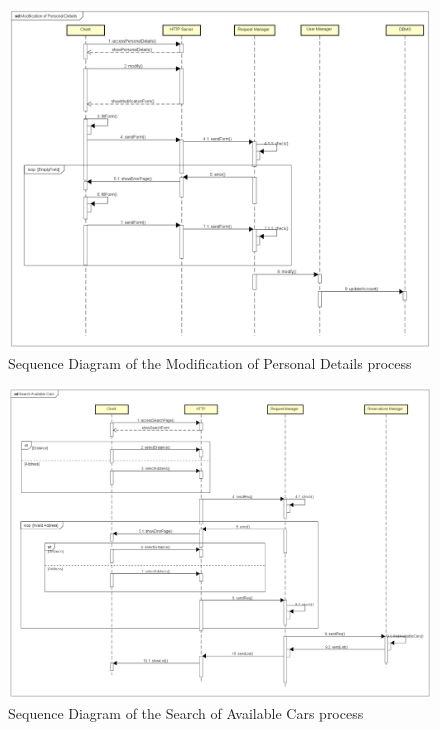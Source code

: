\begin{figure}[H]	
	\centering
	\includegraphics[width=\textwidth]{img/sequence_modification}
	\caption{Sequence Diagram of the Modification of Personal Details process}
\end{figure}
\newpage

\begin{figure}[H]	
	\centering
	\includegraphics[width=\textwidth]{img/sequence_search}
	\caption{Sequence Diagram of the Search of Available Cars process}
\end{figure}
\newpage


